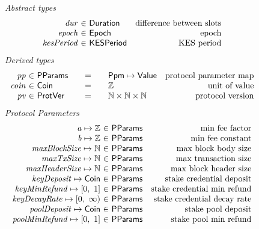 \begin{figure*}[htb]
  \emph{Abstract types}
  \begin{equation*}
    \begin{array}{r@{~\in~}lr}
      \var{dur} & \Duration & \text{difference between slots}\\
      \var{epoch} & \Epoch & \text{epoch} \\
      \var{kesPeriod} & \KESPeriod & \text{KES period} \\
    \end{array}
  \end{equation*}
  \emph{Derived types}
  \begin{equation*}
    \begin{array}{r@{~\in~}l@{\qquad=\qquad}lr}
      \var{pp}
      & \PParams
      & \Ppm \mapsto \Value
      & \text{protocol parameter map}
      \\
      \var{coin}
      & \Coin
      & \Z
      & \text{unit of value}
      \\
      \var{pv}
      & \ProtVer
      & \N\times\N\times\N
      & \text{protocol version}
    \end{array}
  \end{equation*}
  \emph{Protocol Parameters}
  \begin{equation*}
      \begin{array}{r@{~\in~}lr}
        \var{a} \mapsto \Z & \PParams & \text{min fee factor}\\
        \var{b} \mapsto \Z & \PParams & \text{min fee constant}\\
        \var{maxBlockSize} \mapsto \N & \PParams & \text{max block body size}\\
        \var{maxTxSize} \mapsto \N & \PParams & \text{max transaction size}\\
        \var{maxHeaderSize} \mapsto \N & \PParams & \text{max block header size}\\
        \var{keyDeposit} \mapsto \Coin & \PParams & \text{stake credential deposit}\\
        \var{keyMinRefund} \mapsto \unitInterval & \PParams & \text{stake credential min refund}\\
        \var{keyDecayRate} \mapsto \nonnegReals & \PParams & \text{stake credential decay rate}\\
        \var{poolDeposit} \mapsto \Coin & \PParams & \text{stake pool deposit}\\
        \var{poolMinRefund} \mapsto \unitInterval & \PParams & \text{stake pool min refund}\\

\end{array}
\end{equation*}
\end{figure*}
